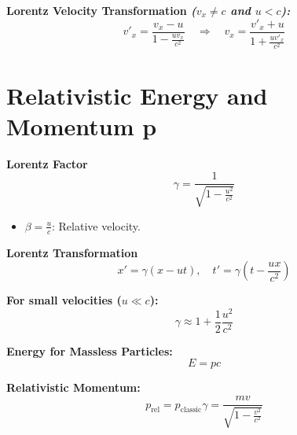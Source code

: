 \documentclass[a4paper,11pt]{article}
\renewcommand{\textbf}[1]{{\scriptsize	\bfseries #1}}
\begin{document}
\begin{footnotesize}
\begin{multicols}{2}
\begin{minipage}{\linewidth}

\textbf{Lorentz Velocity Transformation \textit{($v_x \neq c$ and $u < c$):}} \\[-0.2cm]
\[
v'_x = \frac{v_x - u}{1 - \frac{uv_x}{c^2}} \quad \Rightarrow \quad v_x = \frac{v'_x + u}{1 + \frac{uv'_x}{c^2}}
\]

\end{minipage}

\section*{Relativistic Energy and Momentum p}

\begin{minipage}{\linewidth}

\textbf{Lorentz Factor} \\[-0.2cm]
\[
\gamma = \frac{1}{\sqrt{1 - \frac{u^2}{c^2}}}
\]
\begin{itemize}
    \item $\beta = \frac{u}{c}$: Relative velocity.
\end{itemize}
\end{minipage}
\begin{minipage}{\linewidth}
\textbf{Lorentz Transformation} \\[-0.2cm]
\[
x' = \gamma (x - ut), \quad t' = \gamma \left(t - \frac{ux}{c^2}\right)
\]
\end{minipage}
\begin{minipage}{\linewidth}

\textbf{For small velocities ($u \ll c$):} \\[-0.2cm]
\[
\gamma \approx 1 + \frac{1}{2} \frac{u^2}{c^2}
\]

\end{minipage}

\begin{minipage}{\linewidth}

\textbf{Energy for Massless Particles:} \\[-0.2cm]
\[
E = pc
\]
\end{minipage}

\begin{minipage}{\linewidth}

\textbf{Relativistic Momentum:} \\[-0.2cm]
\[
p_{\text{rel}} = p_{\text{classic}}\gamma = \frac{mv}{\sqrt{1 - \frac{v^2}{c^2}}}
\]

\end{minipage}






\end{multicols}
\end{footnotesize}
\end{document}
